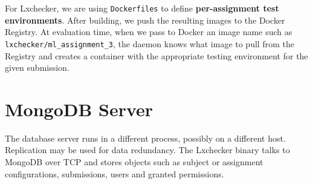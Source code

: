 
For Lxchecker, we are using \texttt{Dockerfiles} to define \textbf{per-assignment test environments}. After building, we push the resulting images to the Docker Registry. At evaluation time, when we pass to Docker an image name such as \texttt{lxchecker/ml_assignment_3}, the daemon knows what image to pull from the Registry and creates a container with the appropriate testing environment for the given submission.


\section{MongoDB Server}
\label{sec:mongo}

The database server runs in a different process, possibly on a different host. Replication may be used for data redundancy. The Lxchecker binary talks to MongoDB over TCP and stores objects such as subject or assignment configurations, submissions, users and granted permissions.
